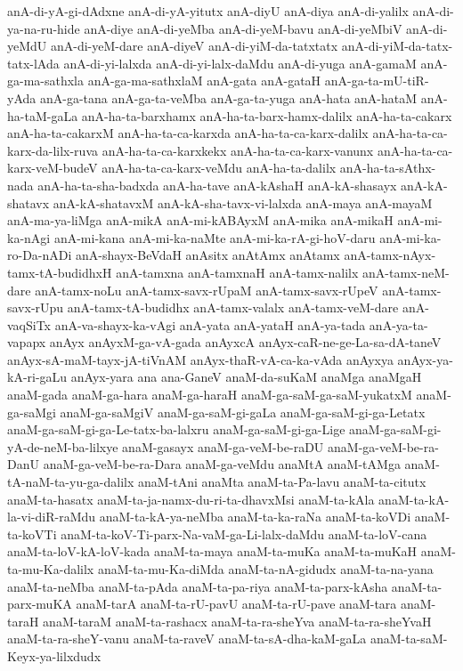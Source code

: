 {anA-di-yA-gi-dAdxne
anA-di-yA-yitutx
anA-diyU
anA-diya
anA-di-yalilx
anA-di-ya-na-ru-hide
anA-diye
anA-di-yeMba
anA-di-yeM-bavu
anA-di-yeMbiV
anA-di-yeMdU
anA-di-yeM-dare
anA-diyeV
anA-di-yiM-da-tatxtatx
anA-di-yiM-da-tatx-tatx-lAda
anA-di-yi-lalxda
anA-di-yi-lalx-daMdu
anA-di-yuga
anA-gamaM
anA-ga-ma-sathxla
anA-ga-ma-sathxlaM
anA-gata
anA-gataH
anA-ga-ta-mU-tiR-yAda
anA-ga-tana
anA-ga-ta-veMba
anA-ga-ta-yuga
anA-hata
anA-hataM
anA-ha-taM-gaLa
anA-ha-ta-barxhamx
anA-ha-ta-barx-hamx-dalilx
anA-ha-ta-cakarx
anA-ha-ta-cakarxM
anA-ha-ta-ca-karxda
anA-ha-ta-ca-karx-dalilx
anA-ha-ta-ca-karx-da-lilx-ruva
anA-ha-ta-ca-karxkekx
anA-ha-ta-ca-karx-vanunx
anA-ha-ta-ca-karx-veM-budeV
anA-ha-ta-ca-karx-veMdu
anA-ha-ta-dalilx
anA-ha-ta-sAthx-nada
anA-ha-ta-sha-badxda
anA-ha-tave
anA-kAshaH
anA-kA-shasayx
anA-kA-shatavx
anA-kA-shatavxM
anA-kA-sha-tavx-vi-lalxda
anA-maya
anA-mayaM
anA-ma-ya-liMga
anA-mikA
anA-mi-kABAyxM
anA-mika
anA-mikaH
anA-mi-ka-nAgi
anA-mi-kana
anA-mi-ka-naMte
anA-mi-ka-rA-gi-hoV-daru
anA-mi-ka-ro-Da-nADi
anA-shayx-BeVdaH
anAsitx
anAtAmx
anAtamx
anA-tamx-nAyx-tamx-tA-budidhxH
anA-tamxna
anA-tamxnaH
anA-tamx-nalilx
anA-tamx-neM-dare
anA-tamx-noLu
anA-tamx-savx-rUpaM
anA-tamx-savx-rUpeV
anA-tamx-savx-rUpu
anA-tamx-tA-budidhx
anA-tamx-valalx
anA-tamx-veM-dare
anA-vaqSiTx
anA-va-shayx-ka-vAgi
anA-yata
anA-yataH
anA-ya-tada
anA-ya-ta-vapapx
anAyx
anAyxM-ga-vA-gada
anAyxcA
anAyx-caR-ne-ge-La-sa-dA-taneV
anAyx-sA-maM-tayx-jA-tiVnAM
anAyx-thaR-vA-ca-ka-vAda
anAyxya
anAyx-ya-kA-ri-gaLu
anAyx-yara
ana
ana-GaneV
anaM-da-suKaM
anaMga
anaMgaH
anaM-gada
anaM-ga-hara
anaM-ga-haraH
anaM-ga-saM-ga-saM-yukatxM
anaM-ga-saMgi
anaM-ga-saMgiV
anaM-ga-saM-gi-gaLa
anaM-ga-saM-gi-ga-Letatx
anaM-ga-saM-gi-ga-Le-tatx-ba-lalxru
anaM-ga-saM-gi-ga-Lige
anaM-ga-saM-gi-yA-de-neM-ba-lilxye
anaM-gasayx
anaM-ga-veM-be-raDU
anaM-ga-veM-be-ra-DanU
anaM-ga-veM-be-ra-Dara
anaM-ga-veMdu
anaMtA
anaM-tAMga
anaM-tA-naM-ta-yu-ga-dalilx
anaM-tAni
anaMta
anaM-ta-Pa-lavu
anaM-ta-citutx
anaM-ta-hasatx
anaM-ta-ja-namx-du-ri-ta-dhavxMsi
anaM-ta-kAla
anaM-ta-kA-la-vi-diR-raMdu
anaM-ta-kA-ya-neMba
anaM-ta-ka-raNa
anaM-ta-koVDi
anaM-ta-koVTi
anaM-ta-koV-Ti-parx-Na-vaM-ga-Li-lalx-daMdu
anaM-ta-loV-cana
anaM-ta-loV-kA-loV-kada
anaM-ta-maya
anaM-ta-muKa
anaM-ta-muKaH
anaM-ta-mu-Ka-dalilx
anaM-ta-mu-Ka-diMda
anaM-ta-nA-gidudx
anaM-ta-na-yana
anaM-ta-neMba
anaM-ta-pAda
anaM-ta-pa-riya
anaM-ta-parx-kAsha
anaM-ta-parx-muKA
anaM-tarA
anaM-ta-rU-pavU
anaM-ta-rU-pave
anaM-tara
anaM-taraH
anaM-taraM
anaM-ta-rashacx
anaM-ta-ra-sheYva
anaM-ta-ra-sheYvaH
anaM-ta-ra-sheY-vanu
anaM-ta-raveV
anaM-ta-sA-dha-kaM-gaLa
anaM-ta-saM-Keyx-ya-lilxdudx
}
